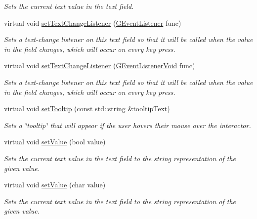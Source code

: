 \begin{DoxyCompactItemize}
\begin{DoxyCompactList}\small\item\em Sets the current text value in the text field. \end{DoxyCompactList}\item 
virtual void \mbox{\hyperlink{classsgl_1_1GTextField_ae41284f9c540110180ac0ad6beca5cb0}{set\+Text\+Change\+Listener}} (\mbox{\hyperlink{namespacesgl_ae9f3e9eab70035da1a2b114e21357b25}{G\+Event\+Listener}} func)
\begin{DoxyCompactList}\small\item\em Sets a text-\/change listener on this text field so that it will be called when the value in the field changes, which will occur on every key press. \end{DoxyCompactList}\item 
virtual void \mbox{\hyperlink{classsgl_1_1GTextField_ae8df75b0746951146d29220f386fcd33}{set\+Text\+Change\+Listener}} (\mbox{\hyperlink{namespacesgl_a54427ce97bb1c2804e4fe2b0a62e8b17}{G\+Event\+Listener\+Void}} func)
\begin{DoxyCompactList}\small\item\em Sets a text-\/change listener on this text field so that it will be called when the value in the field changes, which will occur on every key press. \end{DoxyCompactList}\item 
virtual void \mbox{\hyperlink{classsgl_1_1GInteractor_a039e0e49beaecc275efce02d416acea8}{set\+Tooltip}} (const std\+::string \&tooltip\+Text)
\begin{DoxyCompactList}\small\item\em Sets a \char`\"{}tooltip\char`\"{} that will appear if the user hovers their mouse over the interactor. \end{DoxyCompactList}\item 
virtual void \mbox{\hyperlink{classsgl_1_1GTextField_ae803b3348fa7076308d852bbdeea0d74}{set\+Value}} (bool value)
\begin{DoxyCompactList}\small\item\em Sets the current text value in the text field to the string representation of the given value. \end{DoxyCompactList}\item 
virtual void \mbox{\hyperlink{classsgl_1_1GTextField_aeefe59b3d414b657838869ce084cb0e2}{set\+Value}} (char value)
\begin{DoxyCompactList}\small\item\em Sets the current text value in the text field to the string representation of the given value. \end{DoxyCompactList}\item 

\end{DoxyCompactItemize}
